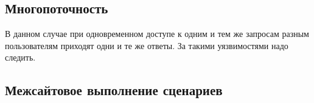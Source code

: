 \documentclass[11pt, a4paper]{article}		%
\begin{document}

\subsection{Многопоточность}

В данном случае при одновременном доступе к одним и тем же запросам разным пользователям приходят одни и те же ответы. За такими уязвимостями надо следить.



\subsection{Межсайтовое выполнение сценариев}
\end{document}

